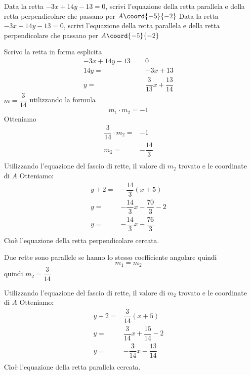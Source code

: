 \begin{exercise}
	Data la retta $-3x+14y-13=0$, scrivi l'equazione della retta parallela e della retta perpendicolare che passano per  $A\coord{-5}{-2}$
	\tcblower
	Data la retta $-3x+14y-13=0$, scrivi l'equazione della retta parallela e della retta perpendicolare che passano per  $A\coord{-5}{-2}$
	
	Scrivo la retta in forma esplicita
	\begin{align*}
		-3x+14y-13=&0\\
		14y=&+3x+13\\
		y=&\dfrac{3}{13}x+\dfrac{13}{14}
	\end{align*}
	 	$m=\dfrac{3}{14}$ utilizzando la formula \[m_1\cdot m_2=-1\] Otteniamo
	 	\begin{align*}
	 		\dfrac{3}{14}\cdot m_2=&-1\\
	 		m_2=&-\dfrac{14}{3}\\
	 	\end{align*}
	 		Utilizzando l'equazione del fascio di rette, il valore di $m_2$ trovato e le coordinate di $A$ Otteniamo:
	 		\begin{align*}
	 			y+2=&-\dfrac{14}{3}(x+5)\\
	 			y=&-\dfrac{14}{3}x-\dfrac{70}{3}-2\\
	 			y=&-\dfrac{14}{3}x-\dfrac{76}{3}\\
	 		\end{align*}
	 		Cioè l'equazione della retta perpendicolare cercata.
	 		
	 		Due rette sono parallele se hanno lo stesso coefficiente angolare quindi \[m_1=m_2 \]
	 		quindi $m_2=\dfrac{3}{14}$ 
	 		
	 		Utilizzando l'equazione del fascio di rette, il valore di $m_2$ trovato e le coordinate di $A$ Otteniamo:
	 		\begin{align*}
	 			y+2=&\dfrac{3}{14}(x+5)\\
	 			y=&\dfrac{3}{14}x+\dfrac{15}{14}-2\\
	 			y=&-\dfrac{3}{14}x-\dfrac{13}{14}\\
	 		\end{align*}
	 		Cioè l'equazione della retta parallela cercata.
	 		
	 			\begin{center}
	 				
	 			\end{center}
\end{exercise}
